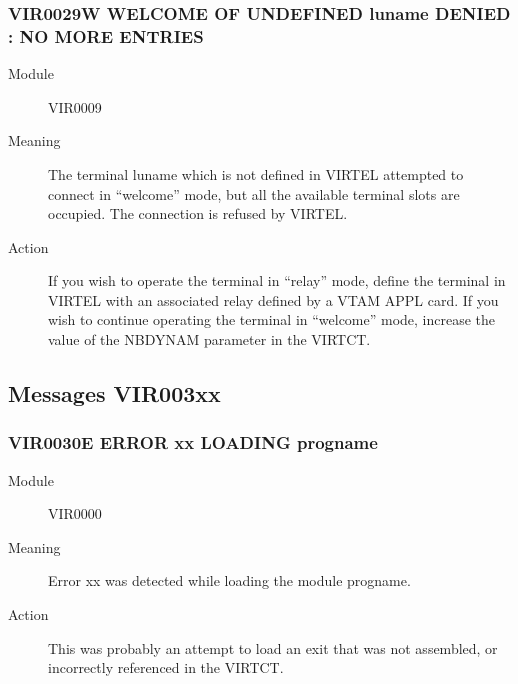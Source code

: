 \documentclass[letterpaper,10pt,english]{sphinxmanual}
\begin{document}
\subsubsection{VIR0029W WELCOME OF UNDEFINED luname DENIED : NO MORE ENTRIES}
\label{\detokenize{messages:vir0029w-welcome-of-undefined-luname-denied-no-more-entries}}\begin{description}
\item[{Module}] \leavevmode
VIR0009

\item[{Meaning}] \leavevmode
The terminal luname which is not defined in VIRTEL attempted to connect in “welcome” mode, but all the available terminal slots are occupied. The connection is refused by VIRTEL.

\item[{Action}] \leavevmode
If you wish to operate the terminal in “relay” mode, define the terminal in VIRTEL with an associated relay defined by a VTAM APPL card. If you wish to continue operating the terminal in “welcome” mode, increase the value of the NBDYNAM parameter in the VIRTCT.

\end{description}


\subsection{Messages VIR003xx}
\label{\detokenize{messages:messages-vir003xx}}

\subsubsection{VIR0030E ERROR xx LOADING progname}
\label{\detokenize{messages:vir0030e-error-xx-loading-progname}}\begin{description}
\item[{Module}] \leavevmode
VIR0000

\item[{Meaning}] \leavevmode
Error xx was detected while loading the module progname.

\item[{Action}] \leavevmode
This was probably an attempt to load an exit that was not assembled, or incorrectly referenced in the VIRTCT.

\end{description}
\end{document}
